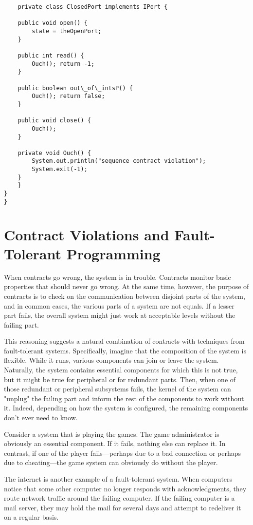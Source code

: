 \documentclass[11pt]{article}
\begin{document}
\begin{verbatim}
    private class ClosedPort implements IPort {

	public void open() { 
	    state = theOpenPort; 
	}

	public int read() {
	    Ouch(); return -1; 
	}

	public boolean out\_of\_intsP() {
	    Ouch(); return false; 
	}

	public void close() {
	    Ouch(); 
	}	

	private void Ouch() {
	    System.out.println("sequence contract violation");
	    System.exit(-1); 
	}
    }
}
}
\end{verbatim}


\section{Contract Violations and Fault-Tolerant Programming}

When contracts go wrong, the system is in trouble. Contracts monitor basic
properties that should never go wrong. At the same time, however, the purpose of
contracts is to check on the communication between disjoint parts of the
system, and in common cases, the various parts of a system are not equals. If a
lesser part fails, the overall system might just work at acceptable levels
without the failing part. 

This reasoning suggests a natural combination of contracts with techniques
from fault-tolerant systems. Specifically, imagine that the composition of the
system is flexible. While it runs, various components can join or leave the
system. Naturally, the system contains essential components for which this is
not true, but it might be true for peripheral or for redundant parts. Then, when
one of those redundant or peripheral subsystems fails, the kernel of the system
can "unplug" the failing part and inform the rest of the components to work
without it. Indeed, depending on how the system is configured, the remaining
components don't ever need to know. 


Consider a system that is playing the games. The game administrator is
obviously an essential component. If it fails, nothing else can replace it. In
contrast, if one of the player fails---perhaps due to a bad connection or
perhaps due to cheating---the game system can obviously do without the player.

The internet is another example of a fault-tolerant system. When computers
notice that some other computer no longer responds with acknowledgments, they
route network traffic around the failing computer. If the failing computer is a
mail server, they may hold the mail for several days and attempt to redeliver it
on a regular basis.
\end{document}
